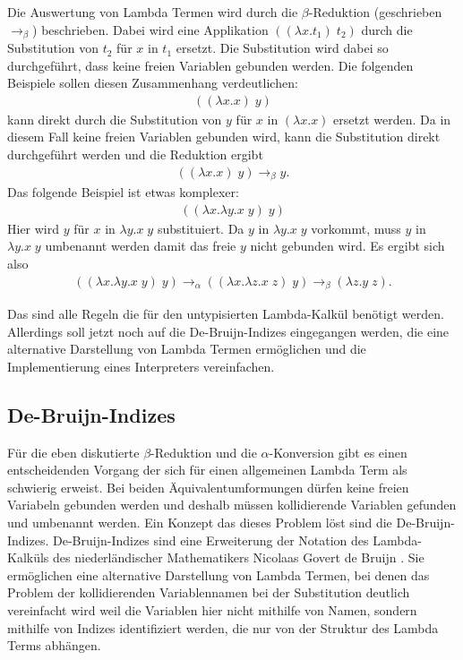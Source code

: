 \documentclass[ngerman]{article}
\newcommand{\doublelinebreak}{\par\vspace{\baselineskip}}
\begin{document}
Die Auswertung von Lambda Termen wird durch die $\beta$-Reduktion (geschrieben $\rightarrow_\beta$) beschrieben.
Dabei wird eine Applikation $((\lambda x.t_1) \; t_2)$ durch die Substitution von $t_2$ für $x$ in $t_1$ ersetzt. Die Substitution wird dabei so durchgeführt, dass keine freien Variablen gebunden werden. Die folgenden Beispiele sollen diesen Zusammenhang verdeutlichen:
\begin{align*}
    ((\lambda x.x) \; y)
\end{align*}
kann direkt durch die Substitution von $y$ für $x$ in $(\lambda x.x)$ ersetzt werden. Da in diesem Fall keine freien Variablen gebunden wird, kann die Substitution direkt durchgeführt werden und die Reduktion ergibt
\begin{align*}
    ((\lambda x.x) \; y) \rightarrow_\beta y.
\end{align*}
Das folgende Beispiel ist etwas komplexer:
\begin{align*}
    ((\lambda x.\lambda y.x \; y) \; y)
\end{align*}
Hier wird $y$ für $x$ in $\lambda y.x \; y$ substituiert. Da $y$ in $\lambda y.x \; y$ vorkommt, muss $y$ in $\lambda y.x \; y$ umbenannt werden damit das freie $y$ nicht gebunden wird. Es ergibt sich also
\begin{align*}
    ((\lambda x.\lambda y.x \; y) \; y) \rightarrow_\alpha ((\lambda x.\lambda z.x \; z) \; y) \rightarrow_\beta (\lambda z.y \; z).
\end{align*}

\doublelinebreak
Das sind alle Regeln die für den untypisierten Lambda-Kalkül benötigt werden.
Allerdings soll jetzt noch auf die De-Bruijn-Indizes eingegangen werden, die eine alternative Darstellung von Lambda Termen ermöglichen und die Implementierung eines Interpreters vereinfachen.

\subsection{De-Bruijn-Indizes}

Für die eben diskutierte $\beta$-Reduktion und die $\alpha$-Konversion gibt es einen entscheidenden Vorgang der sich für einen allgemeinen Lambda Term als schwierig erweist.
Bei beiden Äquivalentumformungen dürfen keine freien Variabeln gebunden werden und deshalb müssen kollidierende Variablen gefunden und umbenannt werden.
Ein Konzept das dieses Problem löst sind die De-Bruijn-Indizes.
De-Bruijn-Indizes sind eine Erweiterung der Notation des Lambda-Kalküls des niederländischer Mathematikers Nicolaas Govert de Bruijn \cite*{DEBRUIJN1972381}. Sie ermöglichen eine alternative Darstellung von Lambda Termen, bei denen das Problem der kollidierenden Variablennamen bei der Substitution deutlich vereinfacht wird weil die Variablen hier nicht mithilfe von Namen, sondern mithilfe von Indizes identifiziert werden, die nur von der Struktur des Lambda Terms abhängen.
\end{document}

